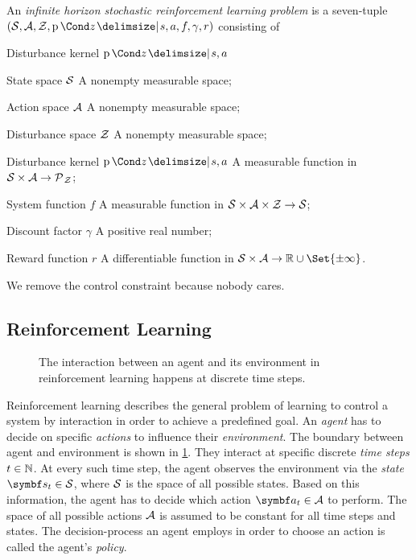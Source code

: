 \begin{definition}
    An \emph{infinite horizon stochastic reinforcement learning problem} is a seven-tuple $(\Sc, \Ac, \Zc, \Prob{z \given s, a}, f, \gamma, r)$ consisting of
    \begin{labeling}{Disturbance kernel $\Prob{z \given s, a}$\quad}
        \item[State space $\mathcal{S}$] A nonempty measurable space;
        \item[Action space $\mathcal{A}$] A nonempty measurable space;
        \item[Disturbance space $\mathcal{Z}$] A nonempty measurable space;
        \item[Disturbance kernel $\Prob{z \given s, a}$] A measurable function in $\mathcal{S} \times \mathcal{A} \to \operatorname{\mathcal{P}\mkern1mu}_{\mathcal{Z}}$;
        \item[System function $f$] A measurable function in  $\mathcal{S} \times \mathcal{A} \times \mathcal{Z} \to \mathcal{S}$;
        \item[Discount factor $\gamma$] A positive real number;
        \item[Reward function $r$] A differentiable function in $\Sc \times \Ac \to \Rb \cup \Set{\pm \infty}$.
    \end{labeling}
\end{definition}
We remove the control constraint because nobody cares.


\subsection{Reinforcement Learning}
\label{sub:reinforcement_learning}
\begin{figure}[t]
    \centering
    
    \caption[Agent-environment interaction]{
        The interaction between an agent and its environment in reinforcement learning happens at discrete time steps.
    }
    \label{fig:agent_environment_interaction}
\end{figure}
Reinforcement learning describes the general problem of learning to control a system by interaction in order to achieve a predefined goal.
An \emph{agent} has to decide on specific \emph{actions} to influence their \emph{environment}.
The boundary between agent and environment is shown in \cref{fig:agent_environment_interaction}.
They interact at specific discrete \emph{time steps} $t \in \mathbb{N}$.
At every such time step, the agent observes the environment via the \emph{state} $\mat{s}_t \in \Sc$, where $\mathcal{S}$ is the space of all possible states.
Based on this information, the agent has to decide which action $\mat{a}_t \in \Ac$ to perform.
The space of all possible actions $\mathcal{A}$ is assumed to be constant for all time steps and states.
The decision-process an agent employs in order to choose an action is called the agent's \emph{policy}.

